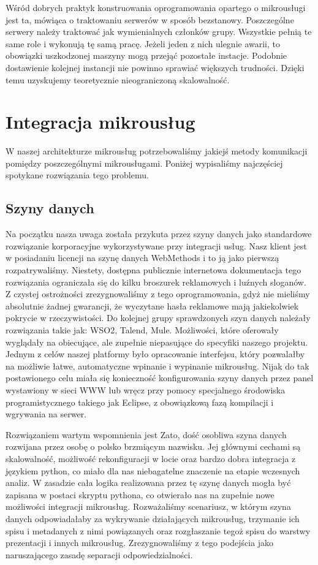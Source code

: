 \documentclass[licencjacka]{pracamgr}
\begin{document}
Wśród dobrych praktyk konstruowania oprogramowania opartego o mikrousługi \cite{nginx}
jest ta, mówiąca o traktowaniu serwerów w sposób bezstanowy. Poszczególne serwery
należy traktować jak wymienialnych członków grupy. Wszystkie pełnią te same role i
wykonują tę samą pracę. Jeżeli jeden z nich ulegnie awarii, to obowiązki uszkodzonej
maszyny mogą przejąć pozostałe instacje. Podobnie dostawienie kolejnej instancji
nie powinno sprawiać większych trudności. Dzięki temu uzyskujemy teoretycznie
nieograniczoną skalowalność.

\section{Integracja mikrousług}
W naszej architekturze mikrousług potrzebowaliśmy jakiejś metody komunikacji
pomiędzy poszczególnymi mikrousługami. Poniżej wypisaliśmy najczęściej spotykane
rozwiązania tego problemu.

\subsection{Szyny danych}

Na początku nasza uwaga została przykuta przez szyny danych jako standardowe rozwiązanie korporacyjne wykorzystywane
przy integracji usług. Nasz klient jest w posiadaniu licencji na szynę danych WebMethods i to ją jako pierwszą
rozpatrywaliśmy. Niestety, dostępna publicznie internetowa dokumentacja tego rozwiązania ograniczała się do kilku
broszurek reklamowych i luźnych sloganów. Z czystej ostrożności zrezygnowaliśmy z tego oprogramowania, gdyż nie
mieliśmy absolutnie żadnej gwarancji, że wyczytane hasła reklamowe mają jakiekolwiek pokrycie w rzeczywistości.
Do kolejnej grupy sprawdzonych szyn danych należały rozwiązania takie jak: WSO2, Talend, Mule. Możliwości, które
oferowały wyglądały na obiecujące, ale zupełnie niepasujące do specyfiki naszego projektu. Jednym z celów naszej
platformy było opracowanie interfejsu, który pozwalałby na możliwie łatwe, automatyczne wpinanie i wypinanie
mikrousług. Nijak do tak postawionego celu miała się konieczność konfigurowania szyny danych przez panel wystawiony w sieci
WWW lub wręcz przy pomocy specjalnego środowiska programistycznego takiego jak Eclipse, z obowiązkową fazą kompilacji
i wgrywania na serwer. 

Rozwiązaniem wartym wspomnienia jest Zato, dość osobliwa szyna danych rozwijana przez osobę o polsko brzmiącym nazwisku. Jej głównymi cechami są skalowalność, możliwość rekonfiguracji w locie oraz bardzo dobra integracja z językiem python, co miało dla nas niebagatelne znaczenie na etapie wczesnych analiz. W zasadzie cała logika realizowana przez tę szynę danych mogła być zapisana w postaci skryptu pythona, co otwierało nas na zupełnie nowe możliwości integracji mikrousług. Rozważaliśmy scenariusz, w którym szyna danych odpowiadałaby za wykrywanie działających mikrousług, trzymanie ich spisu i metadanych z nimi powiązanych oraz rozgłaszanie tegoż spisu do warstwy prezentacji i innych mikrousług. Zrezygnowaliśmy z tego podejścia jako naruszającego zasadę separacji odpowiedzialności.
\end{document}
